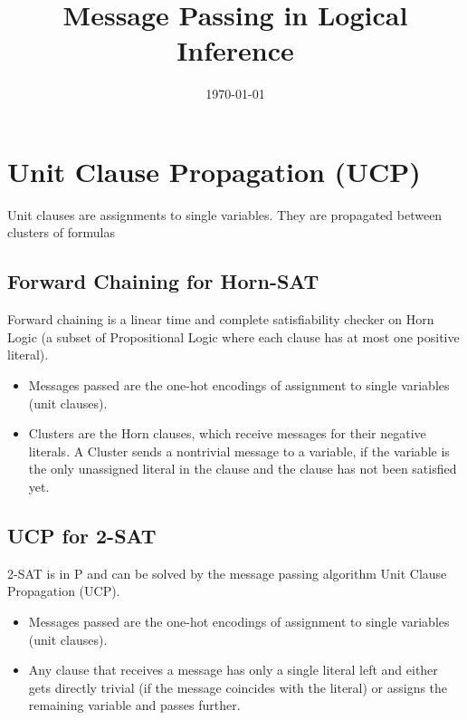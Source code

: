 \documentclass[aps,onecolumn,nofootinbib,pra]{article}
\begin{document}
    \title{Message Passing in Logical Inference}

    \maketitle
    \date{\today}




    \section{Unit Clause Propagation (UCP)}

    Unit clauses are assignments to single variables.
    They are propagated between clusters of formulas


    \subsection{Forward Chaining for Horn-SAT}

    Forward chaining is a linear time and complete satisfiability checker on Horn Logic (a subset of Propositional Logic where each clause has at most one positive literal).
    \begin{itemize}
        \item Messages passed are the one-hot encodings of assignment to single variables (unit clauses).
        \item Clusters are the Horn clauses, which receive messages for their negative literals.
        A Cluster sends a nontrivial message to a variable, if the variable is the only unassigned literal in the clause and the clause has not been satisfied yet.
    \end{itemize}

    \subsection{UCP for 2-SAT}

    2-SAT is in P and can be solved by the message passing algorithm Unit Clause Propagation (UCP).
    \begin{itemize}
        \item Messages passed are the one-hot encodings of assignment to single variables (unit clauses).
        \item Any clause that receives a message has only a single literal left and either gets directly trivial (if the message coincides with the literal) or assigns the remaining variable and passes further.
    \end{itemize}
\end{document}
